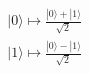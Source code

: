 \documentclass[preview]{standalone}
\begin{document}
\begin{align*}
&|0\rangle \longmapsto \frac{|0\rangle + |1\rangle}{\sqrt{2}} \\ &|1\rangle \longmapsto \frac{|0\rangle - |1\rangle}{\sqrt{2}}
\end{align*}
\end{document}
